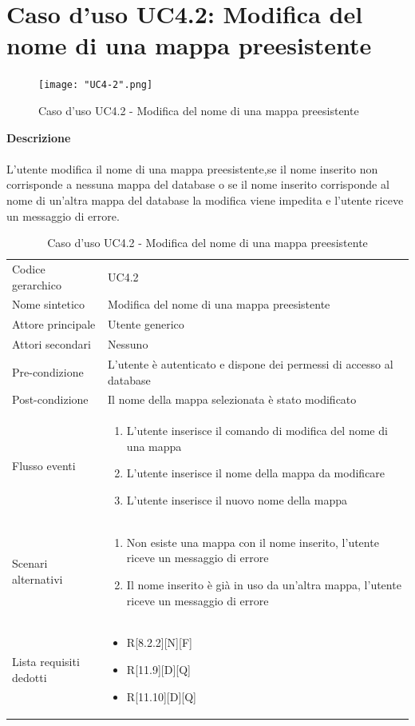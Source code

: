 \documentclass[a4paper]{report}
\begin{document}
	  \section{Caso d'uso UC4.2: Modifica del nome di una mappa preesistente}
	 \begin{figure}[H]
			\centering
			\texttt{[image: "UC4-2".png]}
			\caption{Caso d'uso UC4.2 - Modifica del nome di una mappa preesistente}
		\end{figure}
	 \textbf{Descrizione} \\ \\
	 L'utente modifica il nome di una mappa preesistente,se il nome inserito non corrisponde a nessuna
	 mappa del database o se il nome inserito corrisponde al nome di un'altra mappa del database la
	 modifica viene impedita e l'utente riceve un messaggio di errore.
		\begin{table}[H]
		\begin{tabularx}{\textwidth}{X | X}\toprule
			\rowcolor{orange!65}Codice gerarchico & UC4.2 \\
			Nome sintetico & Modifica del nome di una mappa preesistente \\
			\rowcolor{orange!65}Attore principale & Utente generico\\
			Attori secondari & Nessuno \\
			\rowcolor{orange!65}Pre-condizione & L'utente è autenticato e dispone dei permessi di accesso
			al database\\
			Post-condizione & Il nome della mappa selezionata è stato modificato\\
			\rowcolor{orange!65}Flusso eventi & \begin{enumerate}
			\item L'utente inserisce il comando di modifica del nome di una mappa
			\item L'utente inserisce il nome della mappa da modificare
			\item L'utente inserisce il nuovo nome della mappa
			\end{enumerate} \\
			Scenari alternativi & \begin{enumerate}
			\item Non esiste una mappa con il nome inserito, l'utente riceve un messaggio di errore
			\item Il nome inserito è già in uso da un'altra mappa, l'utente riceve un messaggio di errore
			\end{enumerate} \\
			\rowcolor{orange!65}Lista requisiti dedotti & \begin{itemize}
				\item R[8.2.2][N][F]
				\item R[11.9][D][Q]
				\item R[11.10][D][Q]
				\end{itemize} \\
			\bottomrule
		\end{tabularx}
		\caption{Caso d'uso UC4.2 - Modifica del nome di una mappa preesistente}
	 \end{table}
\end{document}
